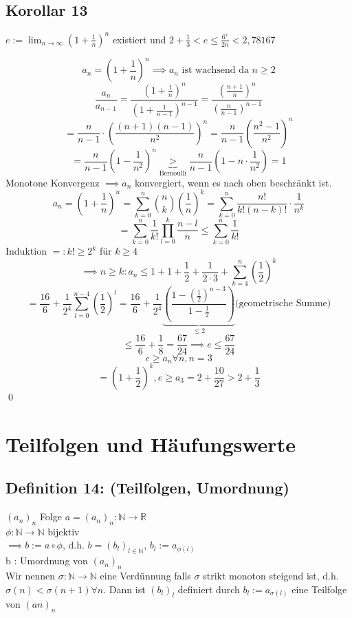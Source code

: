 \documentclass[fleqn]{scrbook}
\renewenvironment{proof}{{\bfseries Beweis }}{\qed}
\begin{document}
\subsection{Korollar 13}
$e := \lim_{n \rightarrow \infty} (1 + \frac{1}{n})^n$ existiert und $2 + \frac{1}{3} < e \leq \frac{6^7}{2n} < 2,78167$

\begin{proof}
\[a_n = (1 + \frac{1}{n})^n \implies a_n\text{ ist wachsend da } n\geq 2\]
\[\frac{a_n}{a_{n-1}} = \frac{(1+\frac{1}{n})^n}{(1+\frac{1}{n-1})^{n-1}} = \frac{(\frac{n+1}{n})^n}{(\frac{n}{n-1})^{n-1}}\]
\[= \frac{n}{n-1}  \cdot  (\frac{(n+1)(n-1)}{n^2})^n = \frac{n}{n-1} (\frac{n^2 - 1}{n^2})^n\]
\[= \frac{n}{n-1} (1-\frac{1}{n^2})^n \underbrace{>}_{\text{Bernoulli}} \frac{n}{n-1} (1 - n  \cdot  \frac{1}{n^2}) = 1\]
Monotone Konvergenz $\implies a_n$ konvergiert, wenn es nach oben beschränkt ist.
\[a_n = (1 + \frac{1}{n})^n = \sum_{k = 0}^n \binom{n}{k} (\frac{1}{n})^k = \sum_{k=0}^n \frac{n!}{k!(n-k)!}  \cdot  \frac{1}{n^k}\]
\[= \sum_{k =0}^n \frac{1}{k!} \prod_{l=0}^k \frac{n-l}{n} \leq \sum_{k=0}^n \frac{1}{k!}\]
Induktion $=: k! \geq 2^k$ für $k\geq 4$
\[\implies n \geq k: a_n \leq 1 + 1 + \frac{1}{2} +  \frac{1}{2  \cdot  3} + \sum_{k = 4}^n (\frac{1}{2})^k\]
\[= \frac{16}{6} + \frac{1}{2^4} \sum_{l = 0}^{n-4} (\frac{1}{2})^l = \frac{16}{6} + \frac{1}{2^4} \underbrace{(\frac{1-(\frac{1}{2})^{n-3}}{1-\frac{1}{2}})}_{\leq 2} \text{(geometrische Summe)}\]
\[\leq \frac{16}{6} + \frac{1}{8} = \frac{67}{24} \implies e \leq \frac{67}{24}\]
\[e \geq a_n \forall n, n = 3\]
\[=(1 + \frac{1}{2})^k, e \geq a_3 = 2 + \frac{10}{27} > 2 + \frac{1}{3}\]
\end{proof}
\section{Teilfolgen und Häufungswerte}
\subsection{Definition 14: (Teilfolgen, Umordnung)} $(a_n)_n$ Folge $a = (a_n)_{n}: \mathbb{N} \rightarrow \mathbb{R}$\\
$\phi : \mathbb{N} \rightarrow \mathbb{N}$ bijektiv\\
$\implies b:= a \circ \phi$, d.h. $b = (b_l)_{l\in\mathbb{N}}$, $b_l := a_{\phi (l)}$\\
b : Umordnung von $(a_n)_n$\\
Wir nennen $\sigma : \mathbb{N} \rightarrow \mathbb{N}$ eine Verdünnung falls $\sigma$ strikt monoton steigend ist, d.h. $\sigma (n) < \sigma (n+1) \forall n$. Dann ist $(b_l)_l$ definiert durch $b_l := a_{\sigma (l)}$ eine Teilfolge von $(an)_n$
\end{document}
